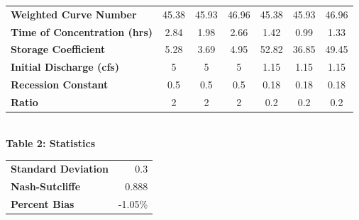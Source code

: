 \documentclass{article}
\begin{document}
\begin{center}
\begin{tabular}{|l|ccc|ccc|}
    \textbf{Weighted Curve Number}       & 45.38           & 45.93           & 46.96           & 45.38           & 45.93           & 46.96            \\
    \textbf{Time of Concentration (hrs)} & 2.84            & 1.98            & 2.66            & 1.42            & 0.99            & 1.33             \\
    \textbf{Storage Coefficient}         & 5.28            & 3.69            & 4.95            & 52.82           & 36.85           & 49.45            \\
    \textbf{Initial Discharge (cfs)}     & 5               & 5               & 5               & 1.15            & 1.15            & 1.15             \\
    \textbf{Recession Constant}          & 0.5             & 0.5             & 0.5             & 0.18            & 0.18            & 0.18             \\
    \textbf{Ratio}                       & 2               & 2               & 2               & 0.2             & 0.2             & 0.2              \\\hline
\end{tabular}
\vspace{5mm}
{\large{\bf \\Table 2: Statistics\\}}
\vspace{3mm}
\begin{tabular}{|l|r|}
    \hline 
    \textbf{Standard Deviation} & 0.3 \\ 
    \textbf{Nash-Sutcliffe} & 0.888 \\ 
    \textbf{Percent Bias} & -1.05\% \\\hline
\end{tabular}
\end{center}
\newpage
\end{document}
